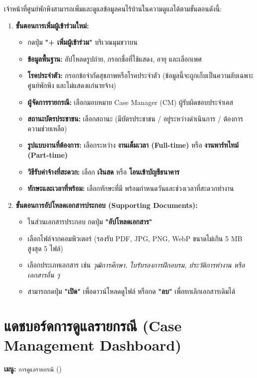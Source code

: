 \documentclass[12pt,a4paper]{report}
\newcommand{\codeinline}[1]{{\ttfamily\path{#1}}}
\begin{document}
เจ้าหน้าที่ศูนย์พักพิงสามารถเพิ่มและดูแลข้อมูลคนไร้บ้านในความดูแลได้ตามขั้นตอนดังนี้:

\begin{enumerate}
    \item \textbf{ขั้นตอนการเพิ่มผู้เข้าร่วมใหม่:}
    \begin{itemize}
        \item กดปุ่ม \textbf{"+ เพิ่มผู้เข้าร่วม"} บริเวณมุมขวาบน
        \item \textbf{ข้อมูลพื้นฐาน:} อัปโหลดรูปถ่าย, กรอกชื่อที่ใช้แสดง, อายุ และเลือกเพศ
        \item \textbf{โรคประจำตัว:} กรอกข้อจำกัดสุขภาพหรือโรคประจำตัว (ข้อมูลนี้จะถูกเก็บเป็นความลับเฉพาะศูนย์พักพิง และไม่แสดงแก่นายจ้าง)
        \item \textbf{ผู้จัดการรายกรณี:} เลือกมอบหมาย Case Manager (CM) ผู้รับผิดชอบประจำเคส
        \item \textbf{สถานะบัตรประชาชน:} เลือกสถานะ (มีบัตรประชาชน / อยู่ระหว่างดำเนินการ / ต้องการความช่วยเหลือ)
        \item \textbf{รูปแบบงานที่ต้องการ:} เลือกระหว่าง \textbf{งานเต็มเวลา (Full-time)} หรือ \textbf{งานพาร์ทไทม์ (Part-time)}
        \item \textbf{วิธีรับค่าจ้างที่สะดวก:} เลือก \textbf{เงินสด} หรือ \textbf{โอนเข้าบัญชีธนาคาร}
        \item \textbf{ทักษะและเวลาที่พร้อม:} เลือกทักษะที่มี พร้อมกำหนดวันและช่วงเวลาที่สะดวกทำงาน
    \end{itemize}

    \item \textbf{ขั้นตอนการอัปโหลดเอกสารประกอบ (Supporting Documents):}
    \begin{itemize}
        \item ในส่วนเอกสารประกอบ กดปุ่ม \textbf{"อัปโหลดเอกสาร"}
        \item เลือกไฟล์จากคอมพิวเตอร์ (รองรับ PDF, JPG, PNG, WebP ขนาดไม่เกิน 5 MB สูงสุด 5 ไฟล์)
        \item เลือกประเภทเอกสาร เช่น \textit{วุฒิการศึกษา, ใบรับรองการฝึกอบรม, ประวัติการทำงาน หรือ เอกสารอื่น ๆ}
        \item สามารถกดปุ่ม \textbf{"เปิด"} เพื่อดาวน์โหลดดูไฟล์ หรือกด \textbf{"ลบ"} เพื่อยกเลิกเอกสารเดิมได้
    \end{itemize}
\end{enumerate}

\section{แดชบอร์ดการดูแลรายกรณี (Case Management Dashboard)}
\textbf{เมนู:} \texttt{การดูแลรายกรณี} (\codeinline{/shelter/case-management})
\end{document}
